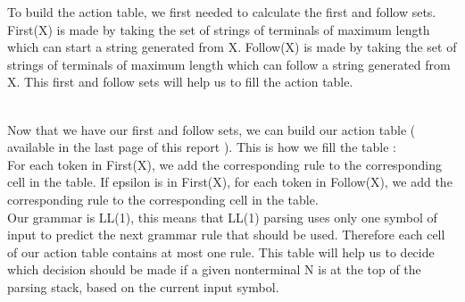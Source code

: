 \documentclass[a4paper,10pt]{report}
\begin{document}
To build the action table, we first needed to calculate the first and follow sets. First(X) is made by taking the set of strings of terminals of maximum length which can start a string generated from X. Follow(X) is made by taking the set of strings of terminals of maximum length which can follow a string generated from X. This first and follow sets will help us to fill the action table.




\hfil\\
Now that we have our first and follow sets, we can build our action table ( available in the last page of this report ). This is how we fill the table :\\ For each token in First(X), we add the corresponding rule to the corresponding cell in the table. If epsilon is in First(X), for each token in Follow(X), we add the corresponding rule to the corresponding cell in the table.\\
Our grammar is LL(1), this means that LL(1) parsing uses only one symbol of input to predict the next grammar rule that should be used. Therefore each cell of our action table contains at most one rule. This table will help us to decide which decision should be made if a given nonterminal N is at the top of the parsing stack, based on the current input symbol.



\end{document}
